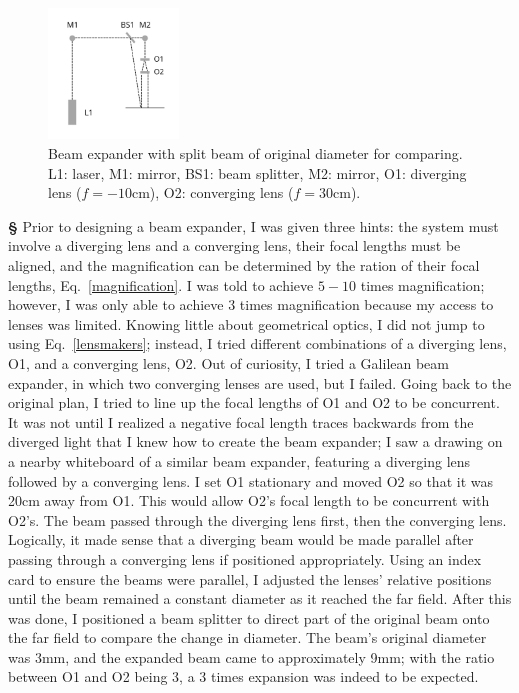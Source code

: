 \documentclass[12pt]{article}
\begin{document}
\newpage
\noindent
\begin{figure}
  \begin{center}
    \includegraphics[width=0.31\textwidth]{E3}
  \end{center}
  \caption{Beam expander with split beam of original diameter for comparing. L1: laser, M1: mirror, BS1: beam splitter, M2: mirror, O1: diverging lens ($f=-10$cm), O2: converging lens ($f=30$cm).}\label{E3}
\end{figure}
\large{\textbf{\S}}
Prior to designing a beam expander, I was given three hints: the system must involve a diverging lens and a converging lens, their focal lengths must be aligned, and the magnification can be determined by the ration of their focal lengths, Eq.~\eqref{magnification}. I was told to achieve $5-10$ times magnification; however, I was only able to achieve $3$ times magnification because my access to lenses was limited. Knowing little about geometrical optics, I did not jump to using Eq.~\eqref{lensmakers}; instead, I tried different combinations of a diverging lens, O1, and a converging lens, O2. Out of curiosity, I tried a Galilean beam expander, in which two converging lenses are used, but I failed. Going back to the original plan, I tried to line up the focal lengths of O1 and O2 to be concurrent. It was not until I realized a negative focal length traces backwards from the diverged light that I knew how to create the beam expander; I saw a drawing on a nearby whiteboard of a similar beam expander, featuring a diverging lens followed by a converging lens. I set O1 stationary and moved O2 so that it was 20cm away from O1. This would allow O2's focal length to be concurrent with O2's. The beam passed through the diverging lens first, then the converging lens. Logically, it made sense that a diverging beam would be made parallel after passing through a converging lens if positioned appropriately. Using an index card to ensure the beams were parallel, I adjusted the lenses' relative positions until the beam remained a constant diameter as it reached the far field. After this was done, I positioned a beam splitter to direct part of the original beam onto the far field to compare the change in diameter. The beam's original diameter was 3mm, and the expanded beam came to approximately 9mm; with the ratio between O1 and O2 being 3, a 3 times expansion was indeed to be expected.
\end{document}
